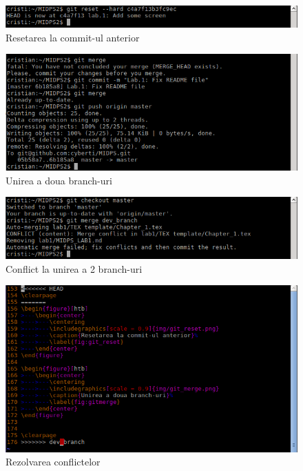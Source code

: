 \begin{figure}[htb]
	\begin{center}
		\centering
		\includegraphics[scale = 0.9]{img/git_reset.png}
		\caption{Resetarea la commit-ul anterior}%
		\label{fig:git_reset}
	\end{center}
\end{figure}

\begin{figure}[htb]
	\begin{center}
		\centering
		\includegraphics[scale = 0.9]{img/git_merge.png}
		\caption{Unirea a doua branch-uri}%
		\label{fig:gitmerge}
	\end{center}
\end{figure}

\begin{figure}[htb]
	\begin{center}
		\centering
		\includegraphics[scale = 0.9]{img/git_conflict.png}
		\caption{Conflict la unirea a 2 branch-uri}%
		\label{fig:conflict}
	\end{center}
\end{figure}

\begin{figure}[htb]
	\begin{center}
		\centering
		\includegraphics[scale = 0.9]{img/git_solv-conflict.png}
		\caption{Rezolvarea conflictelor}%
		\label{fig:conflict}
	\end{center}
\end{figure}

\clearpage